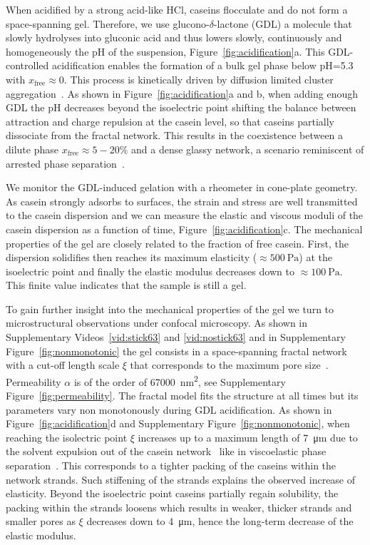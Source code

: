 \documentclass[twocolumn,superscriptaddress,showpacs,preprintnumbers,
amsmath,amssymb,prl]{revtex4-1}
\begin{document}

When acidified by a strong acid-like HCl, caseins flocculate and do not form a space-spanning gel. Therefore, we use glucono-$\delta$-lactone (GDL) a molecule that slowly hydrolyses into gluconic acid and thus lowers slowly, continuously and homogeneously the pH of the suspension, Figure~\ref{fig:acidification}a. This GDL-controlled acidification enables the formation of a bulk gel phase below pH=5.3 with $x_\text{free}\approx 0$. This process is kinetically driven by diffusion limited cluster aggregation~\cite{Bremer1989}. As shown in Figure~\ref{fig:acidification}a and b, when adding enough GDL the pH decreases beyond the isoelectric point shifting the balance between attraction and charge repulsion at the casein level, so that caseins partially dissociate from the fractal network. This results in the coexistence between a dilute phase $x_\text{free}\approx 5-20\%$ and a dense glassy network, a scenario reminiscent of arrested phase separation~\cite{Cardinaux2007,lu2008gelation}.

We monitor the GDL-induced gelation with a rheometer in cone-plate geometry. As casein strongly adsorbs to surfaces, the strain and stress are well transmitted to the casein dispersion and we can measure the elastic and viscous moduli of the casein dispersion as a function of time, Figure~\ref{fig:acidification}c. The mechanical properties of the gel are closely related to the fraction of free casein. First, the dispersion solidifies then reaches its maximum elasticity ($\approx\SI{500}{\pascal}$) at the isoelectric point and finally the elastic modulus decreases down to $\approx\SI{100}{\pascal}$. This finite value indicates that the sample is still a gel.

To gain further insight into the mechanical properties of the gel we turn to microstructural observations under confocal microscopy. As shown in Supplementary Videos~\ref{vid:stick63} and \ref{vid:nostick63} and in Supplementary Figure~\ref{fig:nonmonotonic} the gel consists in a space-spanning fractal network with a cut-off length scale $\xi$ that corresponds to the maximum pore size~\cite{VanDijk1986}. Permeability $\alpha$ is of the order of \SI{67000}{\square\nano\metre}, see Supplementary Figure~\ref{fig:permeability}. The fractal model fits the structure at all times but its parameters vary non monotonously during GDL acidification. As shown in Figure~\ref{fig:acidification}d and Supplementary Figure~\ref{fig:nonmonotonic}, when reaching the isolectric point $\xi$ increases up to a maximum length of \SI{7}{\micro\metre} due to the solvent expulsion out of the casein network~\cite{Lucey1998} like in viscoelastic phase separation~\cite{Tanaka2000h}. This corresponds to a tighter packing of the caseins within the network strands. Such stiffening of the strands explains the observed increase of elasticity. Beyond the isoelectric point caseins partially regain solubility, the packing within the strands loosens which results in weaker, thicker strands and smaller pores as $\xi$ decreases down to \SI{4}{\micro\metre}, hence the long-term decrease of the elastic modulus.
\end{document}
